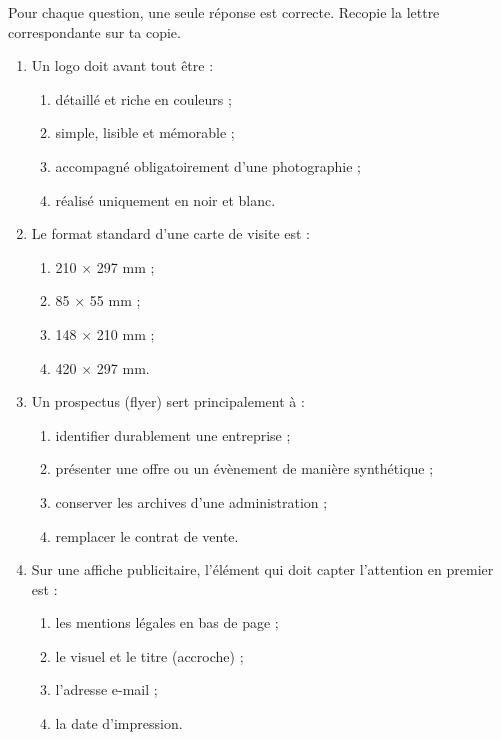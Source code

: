 \documentclass[11pt]{article}
\newcommand{\cle}[1]{{\popxbold\color{popdark}#1}}
\begin{document}
\begin{exercice}
Pour chaque question, une seule réponse est correcte. Recopie la lettre correspondante sur ta copie.

\begin{enumerate}
\item Un \cle{logo} doit avant tout être :
\begin{enumerate}
\item détaillé et riche en couleurs ;
\item simple, lisible et mémorable ;
\item accompagné obligatoirement d'une photographie ;
\item réalisé uniquement en noir et blanc.
\end{enumerate}
\item Le format standard d'une \cle{carte de visite} est :
\begin{enumerate}
\item 210 $\times$ 297 mm ;
\item 85 $\times$ 55 mm ;
\item 148 $\times$ 210 mm ;
\item 420 $\times$ 297 mm.
\end{enumerate}
\item Un \cle{prospectus} (flyer) sert principalement à :
\begin{enumerate}
\item identifier durablement une entreprise ;
\item présenter une offre ou un évènement de manière synthétique ;
\item conserver les archives d'une administration ;
\item remplacer le contrat de vente.
\end{enumerate}
\item Sur une \cle{affiche publicitaire}, l'élément qui doit capter l'attention en premier est :
\begin{enumerate}
\item les mentions légales en bas de page ;
\item le visuel et le titre (accroche) ;
\item l'adresse e-mail ;
\item la date d'impression.
\end{enumerate}
\end{enumerate}
\end{exercice}
\end{document}
